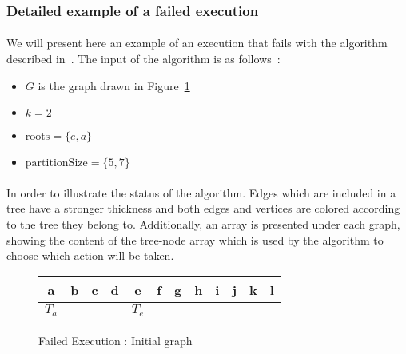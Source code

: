 \label{counter-example}
\subsubsection{Detailed example of a failed execution}


\paragraph{}
We will present here an example of an execution that fails with the algorithm
described in~\cite{JS94}. The input of the algorithm is as follows~:
\begin{itemize}
\item $G$ is the graph drawn in Figure~\ref{FE_K2_init}
\item $k = 2$
\item $\mathrm{roots} = \{ e, a \}$
\item $\mathrm{partitionSize} = \{ 5, 7\}$
\end{itemize}

\paragraph{}
In order to illustrate the status of the algorithm. Edges which are
included in a tree have a stronger thickness and both edges and vertices are
colored according to the tree they belong to. Additionally, an array is
presented under each graph, showing the content of the tree-node array which
is used by the algorithm to choose which action will be taken.

\begin{figure}[H]
  \caption{\label{FE_K2_init}Failed Execution : Initial graph}
  \begin{center}
    \begin{tikzpicture}[scale=0.9,transform shape]
      
    \end{tikzpicture}

    \begin{tabular}{|c|c|c|c|c|c|c|c|c|c|c|c|}
\hline
a & b & c & d & e & f & g & h & i & j & k & l\\
\hline
$T_a$ & & & & $T_e$ & & & & & & &\\
\hline
    \end{tabular}
  \end{center}
\end{figure}

